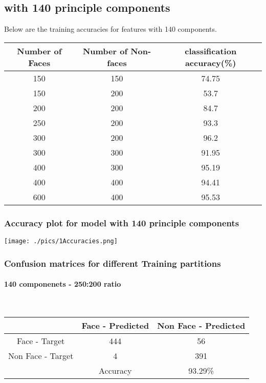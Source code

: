 \documentclass[fleqn]{article}
\newcommand{\myparagraph}[1]{\paragraph{#1}\mbox{}\\}
\begin{document}
\subsection{with 140 principle components}
Below are the training accuracies for features with 140 components.
\begin{center}
  \begin{longtable}{ c | c | c  }
  	\multicolumn{1}{c}{ Number of Faces } & 
	\multicolumn{1}{c}{ Number of Non-faces } & 
	\multicolumn{1}{c}{ classification accuracy(\%)} \\
    \hline
 	150 & 150 & 74.75\\ \hline
 	150 & 200 & 53.7 \\ \hline
 	200 & 200 & 84.7\\ \hline
 	250 & 200 & 93.3\\ \hline
 	300 & 200 & 96.2\\ \hline
 	300 & 300 & 91.95\\ \hline
 	400 & 300 & 95.19\\ \hline
 	400 & 400 & 94.41\\ \hline
 	600 & 400 & 95.53\\ \hline
  \end{longtable}
\end{center}

\subsubsection{Accuracy plot for model with 140 principle components}
\texttt{[image: ./pics/1Accuracies.png]} \newline

\subsubsection{Confusion matrices for different Training partitions}
\myparagraph{140 componenets - 250:200 ratio}

\begin{center}
  \begin{longtable}{ c | c | c  }
  	\multicolumn{1}{c}{ } & 
	\multicolumn{1}{c}{Face - Predicted } & 
	\multicolumn{1}{c}{Non Face - Predicted } \\
    \hline
 	Face - Target & 444& 56\\ \hline
 	Non Face - Target & 4&391 \\ 	\hline
 	& Accuracy & 93.29\% \\ \hline
  \end{longtable}
\end{center}
\end{document}
